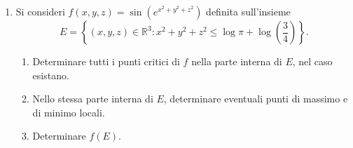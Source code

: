\begin{enumerate}
		Passando alle coordinate polari $x = \rho \cos \theta$, $y = \rho \sin \theta$, si può riscrivere
		\[
		f(x,y) = \bar{f}(\rho, \theta) = \frac{\rho \cos \theta}{\rho^2 + 1}.
		\]
		Essendo $D := [0,+\infty) \times [0,2\pi]$, rimane da determinare $\bar{f}(D)$, che è uguale a $f(\mathbb{R}^2)$. Fissato $\rho > 0$, al variare di $\theta \in [0,2\pi]$, è semplice notare che la $\bar{f}$ copre l'intervallo di valori $\left[-\frac{\rho}{\rho^2 + 1}, \frac{\rho}{\rho^2 + 1}\right]$. Dunque
		\[
		\bar{f}(D) = \bigcup_{\rho \geq 0}\left[-\frac{\rho}{\rho^2 + 1}, \frac{\rho}{\rho^2 + 1}\right].
		\]
		Dalla disuguaglianza $\frac{\rho}{\rho^2 + 1} \leq \frac{1}{2}$, conseguenza di $(\rho - 1)^2 \geq 0$, segue che il valore massimo di $\frac{\rho}{\rho^2 + 1}$ è $\frac{1}{2}$, raggiunto quando $\rho = 1$. Dunque
		\[
		\bar{f}(D) = \left[-\frac{1}{2}, \frac{1}{2}\right],
		\]
		che è dunque anche l'immagine della funzione $f$.

	
	\item Si consideri $f(x,y,z) = \sin\left(e^{x^2 + y^2 + z^2}\right)$ definita sull'insieme
	\[
	E = \left\{(x,y,z) \in \mathbb{R}^3 : x^2 + y^2 + z^2 \leq \log \pi + \log\left(\frac{3}{4}\right)\right\}.
	\]
	\begin{enumerate}
		\item Determinare tutti i punti critici di $f$ nella parte interna di $E$, nel caso esistano.
		\item Nello stessa parte interna di $E$, determinare eventuali punti di massimo e di minimo locali.
		\item Determinare $f(E)$.
	\end{enumerate}
	

\end{enumerate}
